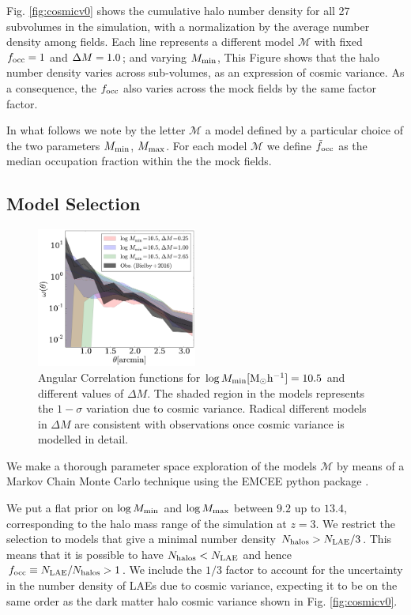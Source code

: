 \documentclass{emulateapj}
\newcommand{\mmin}{{\ifmmode{{M_{\rm min}}}\else{${M_{\rm min}}$}\fi}}
\newcommand{\mmax}{{\ifmmode{{M_{\rm max}}}\else{${M_{\rm max}}$}\fi}}
\newcommand{\dm}{{\ifmmode{{\Delta M}}\else{$\Delta M$}\fi}}
\newcommand{\focc}{{\ifmmode{{f_{\rm occ}}}\else{${f_{\rm occ}}$}\fi}}
\begin{document}
Fig. \ref{fig:cosmicv0}  shows the cumulative halo number density
for all 27 subvolumes in the simulation, with a normalization by the
average number density among fields. 
Each line represents a different model $\mathcal{M}$ with fixed
$\focc=1$ and $\dm=1.0$; and varying $\mmin$, 
This Figure shows that the halo number density varies across
sub-volumes, as an expression of cosmic variance. 
As a consequence, the $\focc$ also varies across the mock fields  
by the same factor factor. 



In what follows we note by the letter ${\mathcal M}$ a model
defined by a particular choice of the two parameters $M_{\rm min}$, 
$M_{\rm  max}$. For each model  ${\mathcal M}$ we define
$\tilde{f}_{\rm occ}$ as the median occupation fraction within the the
mock fields.

\subsection{Model Selection}
\label{subsec:explore}

\begin{figure}
  \includegraphics[width=0.47\textwidth]{fig5.pdf}
\caption{ Angular Correlation functions for $\log M_{\rm
    min}[\rm{M_{\odot}h^{-1}}]=10.5$ and different values of $\Delta
  M$.  
  The shaded region in the models represents the $1-\sigma$ variation
  due to cosmic variance. Radical different models in $\Delta M$ are consistent with
  observations once cosmic variance is modelled in detail.} 
\label{fig:corr}
\end{figure}


We make a thorough parameter space exploration of the models
${\mathcal M}$ by  means of a Markov Chain Monte Carlo technique using
the EMCEE python package \citep{emcee2013}. 

We put a flat prior on $\log M_{\rm min}$ and $\log \mmax$ between
$9.2$ up to $13.4$, corresponding to the halo mass range of 
the simulation at $z=3$.  
We restrict the selection to models that give a minimal number density 
$N_{\rm{halos}}>N_{\rm LAE}/3$.   
This means that it is possible to have $N_{\rm{halos}} < N_{\rm LAE}$
and hence $\focc\equiv N_{\rm{LAE}}/N_{\rm{halos}}>1$.   
We include the $1/3$ factor to account for the uncertainty in the number 
density of LAEs due to cosmic variance, expecting it to be on the
same order as the dark matter halo cosmic variance shown in
Fig. \ref{fig:cosmicv0}.   
\end{document}
